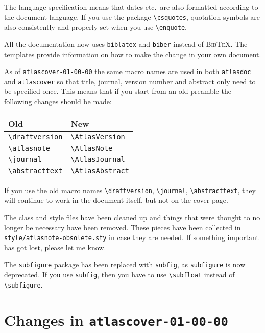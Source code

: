 \documentclass[koma,UKenglish]{style/atlasdoc}
\newcommand{\BibTeX}{\textsc{Bib\TeX}}
\newcommand{\Macro}[1]{\texttt{\textbackslash #1}\xspace}
\begin{document}
The language specification means that dates etc.\ are also formatted according to 
the document language. 
If you use the package \Macro{csquotes}, quotation symbols are also consistently and properly set
when you use \Macro{enquote}.

All the documentation now uses \texttt{biblatex} and \texttt{biber} instead of \BibTeX.
The templates provide information on how to make the change in your own document.

As of \texttt{atlascover-01-00-00} the same macro names are used in both \texttt{atlasdoc} and
\texttt{atlascover} so that title, journal, version number and abstract only need to be specified once.
This means that if you start from an old preamble the following changes should be made:
\begin{center}
	\begin{tabular}{ll}
		Old	& New\\
		\midrule
		\Macro{draftversion} & \Macro{AtlasVersion}\\
		\Macro{atlasnote} & \Macro{AtlasNote}\\
		\Macro{journal} & \Macro{AtlasJournal}\\
		\Macro{abstracttext} & \Macro{AtlasAbstract}
	\end{tabular}
\end{center}
If you use the old macro names 
\Macro{draftversion}, \Macro{journal}, \Macro{abstracttext},
they will continue to work in the document itself, but not on the cover page.

The class and style files have been cleaned up and things 
that were thought to no longer be necessary have been removed.
These pieces have been collected in \texttt{style/atlasnote-obsolete.sty} in case they are needed.
If something important has got lost, please let me know.

The \texttt{subfigure} package has been replaced with \texttt{subfig}, as \texttt{subfigure} is now deprecated.
If you use \texttt{subfig}, then you have to use \Macro{subfloat} instead of \Macro{subfigure}.

\section{Changes in \texttt{atlascover-01-00-00}}
\label{sec:oldcover}
\end{document}
